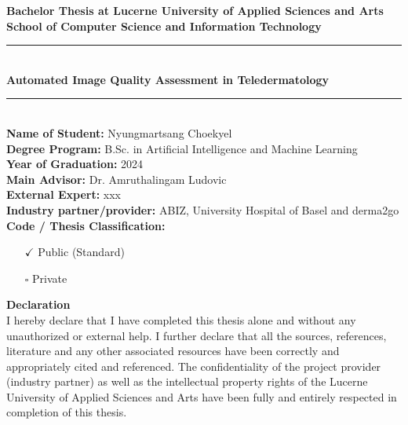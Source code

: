\begin{titlepage}
	\begin{center}
		\null
	\end{center}
\end{titlepage}

\newpage


\raggedright

\textbf{\Large Bachelor Thesis at Lucerne University of Applied Sciences and Arts}\\[0.1cm]
\textbf{\Large School of Computer Science and Information Technology}\\[0.5cm]

\rule{\linewidth}{0.5mm}\\[0.4cm]
{\huge \bfseries Automated Image Quality Assessment in Teledermatology}\\[0.2cm]
\rule{\linewidth}{0.5mm}\\[0.5cm]

\textbf{Name of Student:} Nyungmartsang Choekyel\\
\textbf{Degree Program:} B.Sc. in Artificial Intelligence and Machine Learning\\
\textbf{Year of Graduation:} 2024\\[0.8cm]

\textbf{Main Advisor:} Dr. Amruthalingam Ludovic\\
\textbf{External Expert:} xxx\\
\textbf{Industry partner/provider:} ABIZ, University Hospital of Basel and derma2go\\[0.8cm]

\textbf{Code / Thesis Classification:}\\
\begin{itemize}
	\item[$\checkmark$] Public (Standard)
	\item[$\square$] Private
\end{itemize}
\vspace{0.4cm}

\textbf{Declaration}\\[0.5cm]
I hereby declare that I have completed this thesis alone and without any unauthorized or external help. I further declare that all the sources, references, literature and any other associated resources have been correctly and appropriately cited and referenced. The confidentiality of the project provider (industry partner) as well as the intellectual property rights of the Lucerne University of Applied Sciences and Arts have been fully and entirely respected in completion of this thesis.\\[0.8cm]

